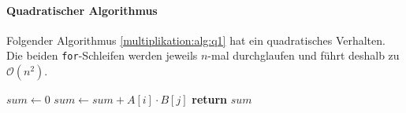 \paragraph{Quadratischer Algorithmus}

Folgender Algorithmus \ref{multiplikation:alg:q1} hat ein quadratisches Verhalten.
Die beiden \texttt{for}-Schleifen werden jeweils $n$-mal durchglaufen und f\"uhrt deshalb zu $\mathcal{O}\left(n^2\right)$.


\begin{algorithm}[H]\footnotesize\caption{}
	\label{multiplikation:alg:q1}
	\setlength{\lineskip}{7pt}
	\begin{algorithmic}
		\State $ sum \gets 0$
		\State $ sum \gets sum + A[i] \cdot B[j] $
		\EndFor
		\EndFor
		\State \textbf{return} $sum$
		\EndFunction
	\end{algorithmic}
\end{algorithm}


